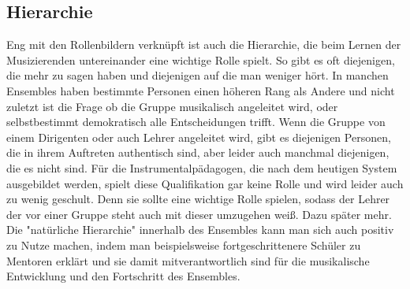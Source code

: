 \subsection{Hierarchie}
Eng mit den Rollenbildern verknüpft ist auch die Hierarchie, die beim Lernen der Musizierenden untereinander eine
wichtige Rolle spielt. So gibt es oft diejenigen, die mehr zu sagen haben und
diejenigen auf die man weniger hört. In manchen Ensembles haben bestimmte
Personen einen höheren Rang als Andere und nicht zuletzt ist die Frage ob die
Gruppe musikalisch angeleitet wird, oder selbstbestimmt demokratisch alle
Entscheidungen trifft. Wenn die Gruppe von einem Dirigenten oder auch Lehrer
angeleitet wird, gibt es diejenigen Personen, die in ihrem Auftreten authentisch
sind, aber leider auch manchmal diejenigen, die es nicht sind. Für die
Instrumentalpädagogen, die nach dem heutigen System ausgebildet werden, spielt
diese Qualifikation gar keine Rolle und wird leider auch zu wenig geschult. Denn
sie sollte eine wichtige Rolle spielen, sodass der Lehrer der vor einer Gruppe
steht auch mit dieser umzugehen weiß. Dazu später mehr. Die "natürliche Hierarchie"
innerhalb des Ensembles kann man sich auch positiv zu Nutze machen, indem man beispielsweise
fortgeschrittenere Schüler zu Mentoren erklärt und sie
damit
mitverantwortlich sind 
für die musikalische Entwicklung und den Fortschritt des Ensembles.\autocite[95]{doerne:umfassend_musizieren}


